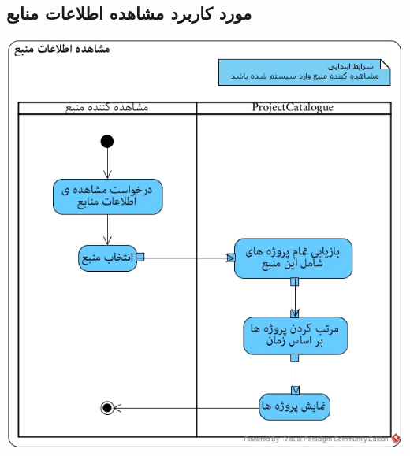 \subsection*{مورد کاربرد مشاهده اطلاعات منابع}
\vspace{2cm}
\begin{center}
\includegraphics[width=\textwidth]{ActivityDiagramsWithSwimlanes/36.jpg}
\end{center}

\newpage
\vspace{2cm}
